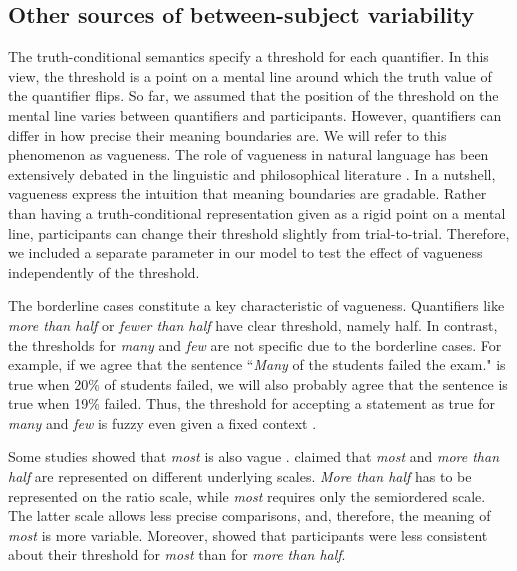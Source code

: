 \documentclass{article}
\begin{document}
\subsection{Other sources of between-subject variability}
The truth-conditional semantics specify a threshold for each quantifier. In this view, the threshold is a point on a mental line around which the truth value of the quantifier flips. So far, we assumed that the position of the threshold on the mental line varies between quantifiers and participants. However, quantifiers can differ in how precise their meaning boundaries are. We will refer to this phenomenon as vagueness. The role of vagueness in natural language has been extensively debated in the linguistic and philosophical literature \cite<see in>{Douven2019Rationality, Glockner2006FuzzyQuantifiers, Solt2015VaguenessFoundations}. In a nutshell, vagueness express the intuition that meaning boundaries are gradable. Rather than having a truth-conditional representation given as a rigid point on a mental line, participants can change their threshold slightly from trial-to-trial. Therefore, we included a separate parameter in our model to test the effect of vagueness independently of the threshold. 

The borderline cases constitute a key characteristic of vagueness. Quantifiers like \textit{more than half} or \textit{fewer than half} have clear threshold, namely half. In contrast, the thresholds for \textit{many} and \textit{few} are not specific due to the borderline cases. For example, if we agree that the sentence ``\textit{Many} of the students failed the exam." is true when 20\% of students failed, we will also probably agree that the sentence is true when 19\% failed. Thus, the threshold for accepting a statement as true for \textit{many} and \textit{few} is fuzzy even given a fixed context \cite{Solt2011}.

Some studies showed that \textit{most} is also vague \cite{Denic2020Are, Solt2011}.  claimed that \textit{most} and \textit{more than half} are represented on different underlying scales. \textit{More than half} has to be represented on the ratio scale, while \textit{most} requires only the semiordered scale. The latter scale allows less precise comparisons, and, therefore, the meaning of \textit{most} is more variable. Moreover,  showed that participants were less consistent about their threshold for \textit{most} than for \textit{more than half}. 
\end{document}
